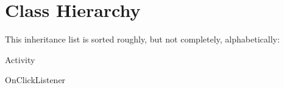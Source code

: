 \section{Class Hierarchy}
This inheritance list is sorted roughly, but not completely, alphabetically\+:\begin{DoxyCompactList}
\item Activity\begin{DoxyCompactList}
\item {}
\end{DoxyCompactList}
\item On\+Click\+Listener\begin{DoxyCompactList}
\item {}
\end{DoxyCompactList}
\end{DoxyCompactList}
